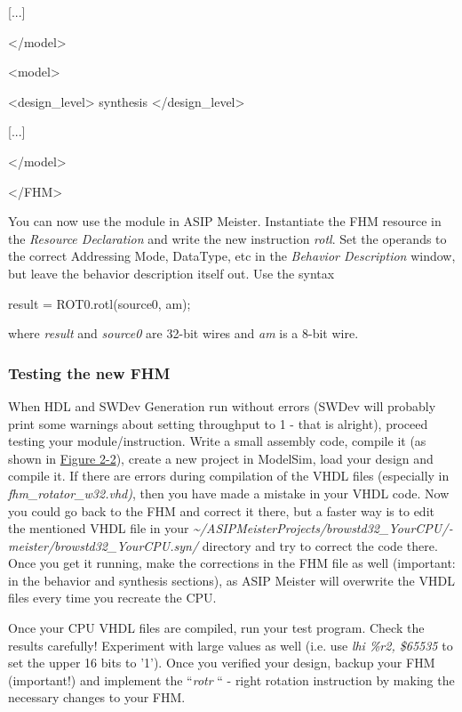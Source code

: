 \documentclass[
]{article}
\begin{document}
{[}...{]}

\textless/model\textgreater{}

\textless model\textgreater{}

\textless design\_level\textgreater{} synthesis
\textless/design\_level\textgreater{}

{[}...{]}

\textless/model\textgreater{}

\textless/FHM\textgreater{}

You can now use the module in ASIP Meister. Instantiate the FHM resource
in the \emph{Resource Declaration} and write the new instruction
\emph{rotl}. Set the operands to the correct Addressing Mode, DataType,
etc in the \emph{Behavior Description} window, but leave the behavior
description itself out. Use the syntax

result = ROT0.rotl(source0, am);

where \emph{result} and \emph{source0} are 32-bit wires and \emph{am} is
a 8-bit wire.

\hypertarget{testing-the-new-fhm}{%
\subsubsection{Testing the new FHM}\label{testing-the-new-fhm}}

When HDL and SWDev Generation run without errors (SWDev will probably
print some warnings about setting throughput to 1 - that is alright),
proceed testing your module/instruction. Write a small assembly code,
compile it (as shown in \protect\hyperlink{Fig22}{Figure 2-2}), create a
new project in ModelSim, load your design and compile it. If there are
errors during compilation of the VHDL files (especially in
\emph{fhm\_rotator\_w32.vhd)}, then you have made a mistake in your VHDL
code. Now you could go back to the FHM and correct it there, but a
faster way is to edit the mentioned VHDL file in your
\emph{\textasciitilde/ASIPMeisterProjects/­browstd32\_YourCPU/­meister/­browstd32\_YourCPU.syn/}
directory and try to correct the code there. Once you get it running,
make the corrections in the FHM file as well (important: in the behavior
{and} synthesis sections), as ASIP Meister will overwrite the VHDL files
every time you recreate the CPU.

Once your CPU VHDL files are compiled, run your test program. Check the
results carefully! Experiment with large values as well (i.e. use
\emph{lhi \%r2, \$65535} to set the upper 16 bits to '1'). Once you
verified your design, backup your FHM (important!) and implement the
``\emph{rotr} `` - right rotation instruction by making the necessary
changes to your FHM.
\end{document}
